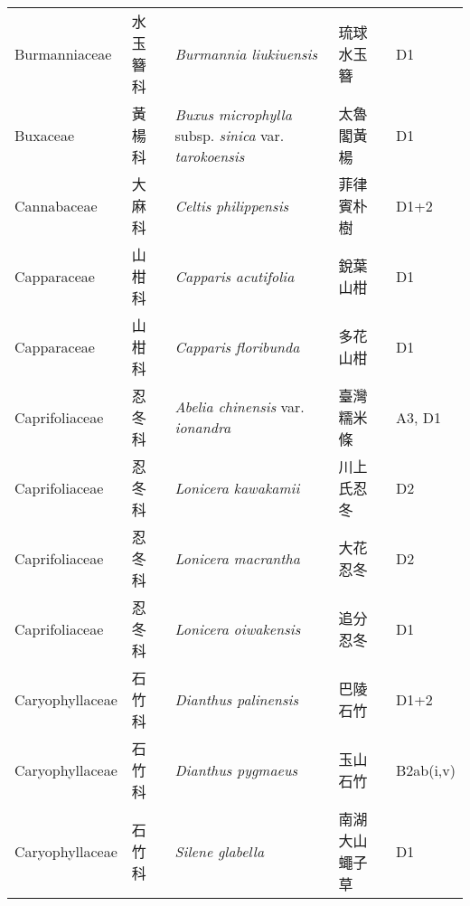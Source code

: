 {\begin{longtable}{p{2.5cm}p{2.5cm}p{4.5cm}p{2.5cm}p{3cm}}
    Burmanniaceae & 水玉簪科 & \textit{Burmannia liukiuensis}  & 琉球水玉簪 & D1 \index{Burmannia@\textit{Burmannia}!liukiuensis@\textit{liukiuensis}}  \index{琉球水玉簪} \\
    Buxaceae & 黃楊科 & \textit{Buxus microphylla} subsp. \textit{sinica} var. \textit{tarokoensis}  & 太魯閣黃楊 & D1 \index{Buxus@\textit{Buxus}!microphylla@\textit{microphylla}!subsp. sinica@subsp. \textit{sinica}!var. tarokoensis@var. \textit{tarokoensis}}  \index{太魯閣黃楊} \\
    Cannabaceae & 大麻科 & \textit{Celtis philippensis}  & 菲律賓朴樹 & D1+2 \index{Celtis@\textit{Celtis}!philippensis@\textit{philippensis}}  \index{菲律賓朴樹} \\
    Capparaceae & 山柑科 & \textit{Capparis acutifolia}  & 銳葉山柑 & D1 \index{Capparis@\textit{Capparis}!acutifolia@\textit{acutifolia}}  \index{銳葉山柑} \\
    Capparaceae & 山柑科 & \textit{Capparis floribunda}  & 多花山柑 & D1 \index{Capparis@\textit{Capparis}!floribunda@\textit{floribunda}}  \index{多花山柑} \\
    Caprifoliaceae & 忍冬科 & \textit{Abelia chinensis} var. \textit{ionandra}  & 臺灣糯米條 & A3, D1 \index{Abelia@\textit{Abelia}!chinensis@\textit{chinensis}!var. ionandra@var. \textit{ionandra}}  \index{臺灣糯米條} \\
    Caprifoliaceae & 忍冬科 & \textit{Lonicera kawakamii}  & 川上氏忍冬 & D2 \index{Lonicera@\textit{Lonicera}!kawakamii@\textit{kawakamii}}  \index{川上氏忍冬} \\
    Caprifoliaceae & 忍冬科 & \textit{Lonicera macrantha}  & 大花忍冬 & D2 \index{Lonicera@\textit{Lonicera}!macrantha@\textit{macrantha}}  \index{大花忍冬} \\
    Caprifoliaceae & 忍冬科 & \textit{Lonicera oiwakensis}  & 追分忍冬 & D1 \index{Lonicera@\textit{Lonicera}!oiwakensis@\textit{oiwakensis}}  \index{追分忍冬} \\
    Caryophyllaceae & 石竹科 & \textit{Dianthus palinensis}  & 巴陵石竹 & D1+2 \index{Dianthus@\textit{Dianthus}!palinensis@\textit{palinensis}}  \index{巴陵石竹} \\
    Caryophyllaceae & 石竹科 & \textit{Dianthus pygmaeus}  & 玉山石竹 & B2ab(i,v) \index{Dianthus@\textit{Dianthus}!pygmaeus@\textit{pygmaeus}}  \index{玉山石竹} \\
    Caryophyllaceae & 石竹科 & \textit{Silene glabella}  & 南湖大山蠅子草 & D1 \index{Silene@\textit{Silene}!glabella@\textit{glabella}}  \index{南湖大山蠅子草} \\

\end{longtable}}
